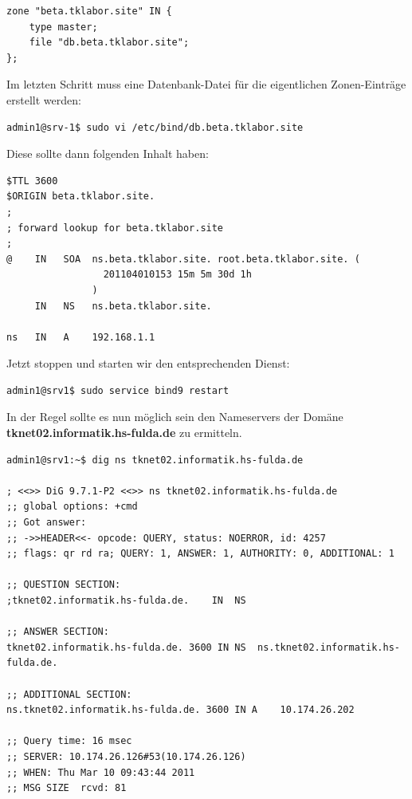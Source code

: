 \begin{scriptsize}
\begin{lstlisting}
zone "beta.tklabor.site" IN {
	type master;
	file "db.beta.tklabor.site";
};
\end{lstlisting}
\end{scriptsize}

Im letzten Schritt muss eine Datenbank-Datei für die eigentlichen
Zonen-Einträge erstellt werden:

\begin{lstlisting}
admin1@srv-1$ sudo vi /etc/bind/db.beta.tklabor.site
\end{lstlisting}

Diese sollte dann folgenden Inhalt haben:

\begin{scriptsize}
\begin{lstlisting}
$TTL 3600
$ORIGIN beta.tklabor.site.
;
; forward lookup for beta.tklabor.site
;
@    IN   SOA  ns.beta.tklabor.site. root.beta.tklabor.site. ( 
                 201104010153 15m 5m 30d 1h
               )
     IN   NS   ns.beta.tklabor.site.

ns   IN   A    192.168.1.1
\end{lstlisting}
\end{scriptsize}

Jetzt stoppen und starten wir den entsprechenden Dienst:
\begin{lstlisting}
admin1@srv1$ sudo service bind9 restart
\end{lstlisting}

In der Regel sollte es nun möglich sein den Nameservers der Domäne \\ \textbf{tknet02.informatik.hs-fulda.de} zu ermitteln.
\begin{scriptsize}
\begin{lstlisting}
admin1@srv1:~$ dig ns tknet02.informatik.hs-fulda.de

; <<>> DiG 9.7.1-P2 <<>> ns tknet02.informatik.hs-fulda.de
;; global options: +cmd
;; Got answer:
;; ->>HEADER<<- opcode: QUERY, status: NOERROR, id: 4257
;; flags: qr rd ra; QUERY: 1, ANSWER: 1, AUTHORITY: 0, ADDITIONAL: 1

;; QUESTION SECTION:
;tknet02.informatik.hs-fulda.de.	IN	NS

;; ANSWER SECTION:
tknet02.informatik.hs-fulda.de.	3600 IN	NS	ns.tknet02.informatik.hs-fulda.de.

;; ADDITIONAL SECTION:
ns.tknet02.informatik.hs-fulda.de. 3600	IN A	10.174.26.202

;; Query time: 16 msec
;; SERVER: 10.174.26.126#53(10.174.26.126)
;; WHEN: Thu Mar 10 09:43:44 2011
;; MSG SIZE  rcvd: 81
\end{lstlisting}
\end{scriptsize}
